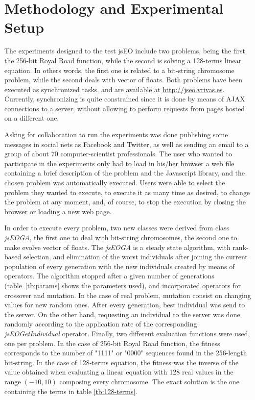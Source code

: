 \documentclass[runningheads,a4paper]{llncs}
\begin{document}
\section{Methodology and Experimental Setup}
\label{sec:method}
The experiments designed to the test jsEO include two problems, being the first the 256-bit Royal Road function, while the second is solving a 128-terms linear equation. In others words, the first one is related to a bit-string chromosome problem, while the second deals with vector of floats. Both problems have been executed as synchronized tasks, and are available at \url{http://jseo.vrivas.es}. Currently, synchronizing is quite constrained since it is done by means of AJAX connections to a server, without allowing to perform requests from pages hosted on a different one. 

Asking for collaboration to run the experiments was done publishing some messages in social nets as Facebook and Twitter, as well as sending an email to a group of about 70 computer-scientist professionals. The user who wanted to participate in the experiments only had to load in his/her browser a web file containing a brief description of the problem and the Javascript library, and the chosen problem was automatically executed. Users were able to select the problem they wanted to execute, to execute it as many time as desired, to change the problem at any moment, and, of course, to stop the execution by closing the browser or loading a new web page.

In order to execute every problem, two new classes were derived from class \textit{jsEOGA}, the first one to deal with bit-string chromosomes, the second one to make evolve vector of floats. The \textit{jsEOGA} is a steady state algorithm, with rank-based selection, and elimination of the worst individuals after joining the current population of every generation with the new individuals created by means of operators. The algorithm stopped after a given number of generations (table~\ref{tb:params} shows the parameters used), and incorporated operators for crossover and mutation. In the case of real problem, mutation consist on changing values for new random ones. After every generation, best individual was send to the server. On the other hand, requesting an individual to the server was done randomly according to the application rate of the corresponding \textit{jsEOGetIndividual} operator. Finally, two different evaluation functions were used, one per problem. In the case of 256-bit Royal Road function, the fitness corresponds to the number of "1111" or "0000" sequences found in the 256-length bit-string. In the case of 128-terms equation, the fitness was the inverse of the value obtained when evaluating a linear equation with 128 real values in the range $(-10,10)$ composing every chromosome. The exact solution is the one containing the terms in table \ref{tb:128-terms}.
\end{document}
